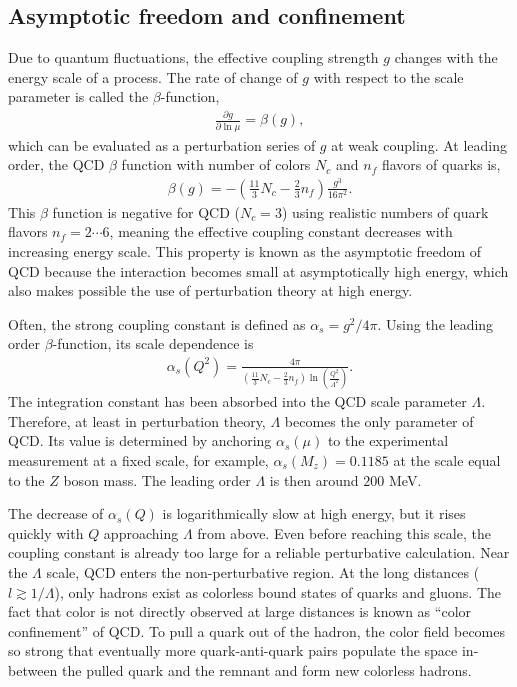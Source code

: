 \subsection{Asymptotic freedom and confinement}
Due to quantum fluctuations, the effective coupling strength $g$ changes with the energy scale of a process. 
The rate of change of $g$ with respect to the scale parameter is called the $\beta$-function,
\begin{eqnarray}
\frac{\partial g}{\partial \ln\mu} = \beta(g),
\end{eqnarray}
which can be evaluated as a perturbation series of $g$ at weak coupling.
At leading order, the QCD $\beta$ function with number of colors $N_c$ and $n_f$ flavors of quarks is,
\begin{eqnarray}
\beta(g) = - \left( \frac{11}{3}N_c - \frac{2}{3}n_f \right) \frac{g^3}{16\pi^2}.
\end{eqnarray}
This $\beta$ function is negative for QCD ($N_c=3$) using realistic numbers of quark flavors $n_f = 2\cdots 6$, meaning the effective coupling constant decreases with increasing energy scale.
This property is known as the asymptotic freedom of QCD because the interaction becomes small at asymptotically high energy, which also makes possible the use of perturbation theory at high energy.

Often, the strong coupling constant is defined as $\alpha_s = g^2/4\pi$.
Using the leading order $\beta$-function, its scale dependence is
\begin{eqnarray}
    \alpha_s(Q^2) = \frac{4\pi}{\left(\frac{11}{3}N_c - \frac{2}{3}n_f\right)\ln\left(\frac{Q^2}{\Lambda^2}\right)}.
\end{eqnarray}
The integration constant has been absorbed into the QCD scale parameter $\Lambda$.
Therefore, at least in perturbation theory, $\Lambda$ becomes the only parameter of QCD. 
Its value is determined by anchoring $\alpha_s(\mu)$ to the experimental measurement at a fixed scale, for example, $\alpha_s(M_z) = 0.1185$ at the scale equal to the $Z$ boson mass.
The leading order $\Lambda$ is then around $200$ MeV.

The decrease of $\alpha_s(Q)$ is logarithmically slow at high energy, but it rises quickly with $Q$ approaching $\Lambda$ from above.
Even before reaching this scale, the coupling constant is already too large for a reliable perturbative calculation.
Near the $\Lambda$ scale, QCD enters the non-perturbative region.
At the long distances ($l \gtrsim 1/\Lambda$), only hadrons exist as colorless bound states of quarks and gluons.
The fact that color is not directly observed at large distances is known as ``color confinement'' of QCD. 
To pull a quark out of the hadron, the color field becomes so strong that eventually more quark-anti-quark pairs populate the space in-between the pulled quark and the remnant and form new colorless hadrons.

